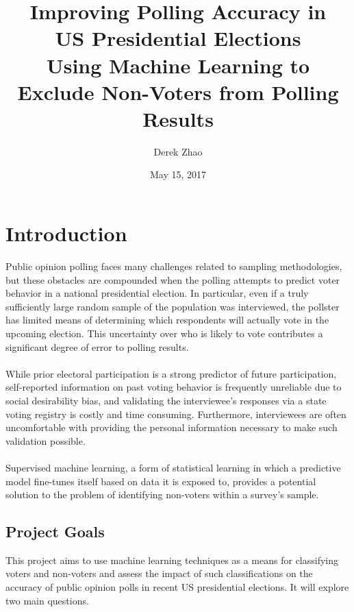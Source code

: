\documentclass{article}
\title{%
	Improving Polling Accuracy in \\ US Presidential Elections \\
	\large Using Machine Learning to Exclude Non-Voters from Polling Results}
\author{Derek Zhao}
\date{May 15, 2017}
\begin{document}
	\maketitle
	\setcounter{tocdepth}{2}
	\tableofcontents
	\newpage
	
	\section{Introduction}
	
	Public opinion polling faces many challenges related to sampling methodologies, but these obstacles are compounded when the polling attempts to predict voter behavior in a national presidential election. In particular, even if a truly sufficiently large random sample of the population was interviewed, the pollster has limited means of determining which respondents will actually vote in the upcoming election. This uncertainty over who is likely to vote contributes a significant degree of error to polling results.
	\\\\
	While prior electoral participation is a strong predictor of future participation, self-reported information on past voting behavior is frequently unreliable due to social desirability bias\footnotemark, and validating the interviewee's responses via a state voting registry is costly and time consuming. Furthermore, interviewees are often uncomfortable with providing the personal information necessary to make such validation possible.
	\\\\
	Supervised machine learning, a form of statistical learning in which a predictive model fine-tunes itself based on data it is exposed to, provides a potential solution to the problem of identifying non-voters within a survey's sample.
	
	\subsection{Project Goals}
	
	This project aims to use machine learning techniques as a means for classifying voters and non-voters and assess the impact of such classifications on the accuracy of public opinion polls in recent US presidential elections. It will explore two main questions.
	
\end{document}
